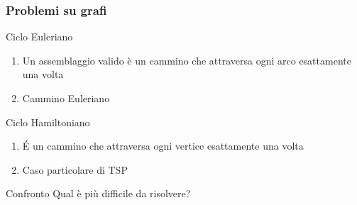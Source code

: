 \begin{frame}[fragile]
\frametitle{Problemi su grafi}
\begin{block}{Ciclo Euleriano}
\begin{enumerate}
\item
Un assemblaggio valido è un cammino che attraversa \alert{ogni arco} esattamente una volta
\item
Cammino Euleriano
\end{enumerate}
\end{block}
\begin{block}{Ciclo Hamiltoniano}
\begin{enumerate}
\item
\'E un cammino che attraversa \alert{ogni vertice} esattamente una volta
\item
Caso particolare di TSP
\end{enumerate}
\end{block}
\begin{block}{Confronto}
Qual è più difficile da risolvere?
\end{block}
\end{frame}



